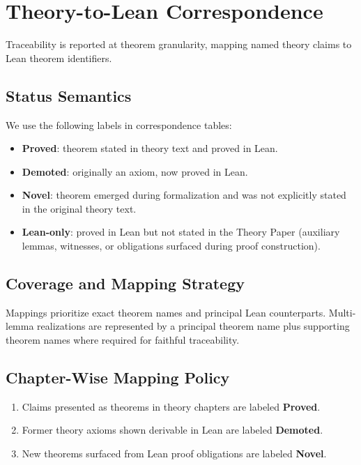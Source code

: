 \section{Theory-to-Lean Correspondence}

Traceability is reported at theorem granularity, mapping named theory claims to
Lean theorem identifiers.

\subsection{Status Semantics}
\label{sec:status-semantics}

We use the following labels in correspondence tables:
\begin{itemize}
  \item \textbf{Proved}: theorem stated in theory text and proved in Lean.
  \item \textbf{Demoted}: originally an axiom, now proved in Lean.
  \item \textbf{Novel}: theorem emerged during formalization and was not explicitly stated in the original theory text.
  \item \textbf{Lean-only}: proved in Lean but not stated in the Theory Paper (auxiliary lemmas, witnesses, or obligations surfaced during proof construction).
\end{itemize}

\subsection{Coverage and Mapping Strategy}

Mappings prioritize exact theorem names and principal Lean counterparts.
Multi-lemma realizations are represented by a principal theorem name plus
supporting theorem names where required for faithful traceability.

\subsection{Chapter-Wise Mapping Policy}

\begin{enumerate}
  \item Claims presented as theorems in theory chapters are labeled \textbf{Proved}.
  \item Former theory axioms shown derivable in Lean are labeled \textbf{Demoted}.
  \item New theorems surfaced from Lean proof obligations are labeled \textbf{Novel}.
\end{enumerate}

